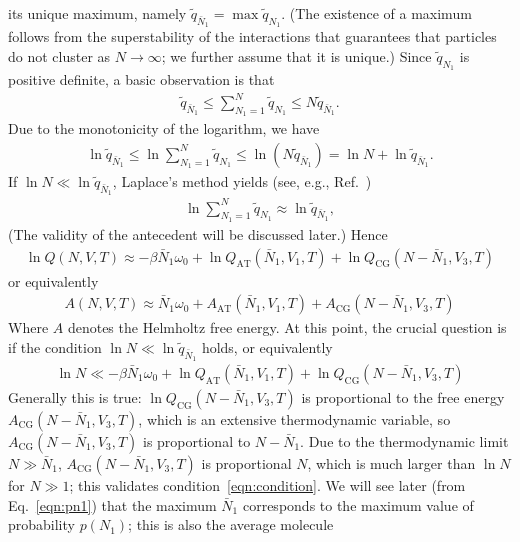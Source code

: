 \documentclass[aps,a4paper,reprint,onecolumn]{revtex4}
\newcommand{\AT}{{\textrm{{AT}}}}
\newcommand{\CG}{{\textrm{CG}}}
\begin{document}
its unique maximum, namely $\tilde q_{\bar N_1} = \max \tilde q_{N_1}$. (The existence of a maximum follows from the superstability of the interactions that guarantees that particles do not cluster as $N\to\infty$; we further assume that it is unique.) Since $\tilde q_{N_1}$ is positive definite, a basic
observation is that
\begin{align}
  \tilde q_{\bar N_1}
  \leq
  \sum_{N_1=1}^N \tilde q_{N_1}
  \leq
  N \tilde q_{\bar N_1}. 
\end{align}
Due to the monotonicity of the logarithm, we have
\begin{align}
  \ln\tilde q_{\bar N_1}
  \leq
  \ln\sum_{N_1=1}^N \tilde q_{N_1}
  \leq
  \ln (N \tilde q_{\bar N_1})
  =
  \ln N + \ln\tilde q_{\bar N_1}.
\end{align}
If $\ln N \ll \ln \tilde q_{\bar N_1}$, Laplace's method yields (see, e.g., Ref.~) 
\begin{align}
  \ln\sum_{N_1=1}^N \tilde q_{N_1}
  \approx
  \ln\tilde q_{\bar N_1},
\end{align}
(The validity of the antecedent will be discussed later.) Hence
\begin{align}
  \ln Q(N, V, T)
  \approx
  -\beta \bar N_1\omega_0 + 
  \ln Q_{\AT}(\bar N_1, V_1, T) + \ln Q_{\CG}(N - \bar N_1, V_3, T)
\end{align}
or equivalently
\begin{align}\label{eqn:a-energy-1}
  A(N, V, T)
  \approx
  \bar N_1\omega_0 +
  A_{\AT}(\bar N_1, V_1, T) + A_{\CG}(N - \bar N_1, V_3, T)
\end{align}
Where $A$ denotes the Helmholtz free energy. 
At this point, the crucial question is if the condition $\ln N \ll \ln \tilde q_{\bar N_1}$
holds, or equivalently
\begin{align}\label{eqn:condition}
  \ln N 
  \ll
  -\beta \bar N_1\omega_0 +
  \ln Q_{\AT}(\bar N_1, V_1, T) + \ln Q_{\CG}(N - \bar N_1, V_3, T)
\end{align}
Generally this is true: $\ln Q_{\CG}(N - \bar N_1, V_3, T)$
is proportional to the free energy $A_{\CG}(N - \bar N_1, V_3, T)$,
which is an extensive thermodynamic variable, so
$A_{\CG}(N - \bar N_1, V_3, T)$ is proportional to $N-\bar N_1$.
Due to the thermodynamic limit $N \gg \bar N_1$,
$A_{\CG}(N - \bar N_1, V_3, T)$ is proportional $N$, which
is much larger than $\ln N$ for $N\gg 1$; this
validates condition~\eqref{eqn:condition}.
We will see later (from Eq.~\eqref{eqn:pn1})
that the maximum $\bar N_1$ corresponds to the maximum
value of probability $p(N_1)$; this is also the average molecule
\end{document}
